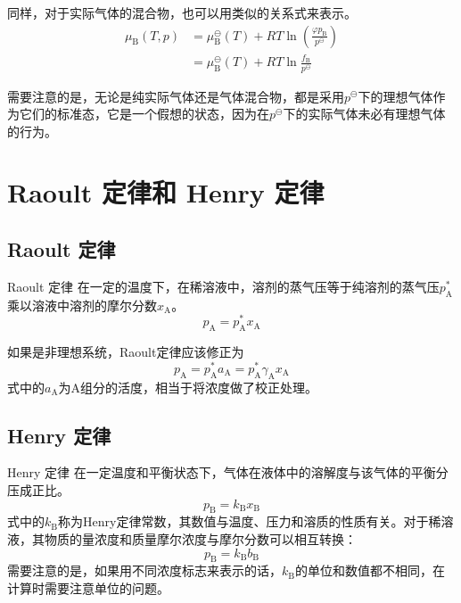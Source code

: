 \documentclass[lang=cn,newtx,11pt,scheme=chinese]{elegantbook}
\begin{document}
同样，对于实际气体的混合物，也可以用类似的关系式来表示。
\begin{equation}
	\begin{aligned}
		\mu_\mathrm{B}(T,p) &=\mu_\mathrm{B}^\ominus(T)+RT\ln \left(\frac{\varphi p_\mathrm{B}}{p^\ominus}\right) \\
		&= \mu_\mathrm{B}^\ominus(T)+RT \ln \frac{f_\mathrm{B}}{p^\ominus}
	\end{aligned}
\end{equation}

需要注意的是，无论是纯实际气体还是气体混合物，都是采用$p^\ominus$下的理想气体作为它们的标准态，它是一个假想的状态，因为在$p^\ominus$下的实际气体未必有理想气体的行为。

\section{Raoult 定律和 Henry 定律}
\subsection{Raoult 定律}
\begin{theorem}{Raoult 定律}
	在一定的温度下，在稀溶液中，溶剂的蒸气压等于纯溶剂的蒸气压$p^*_\mathrm{A}$乘以溶液中溶剂的摩尔分数$x_\mathrm{A}$。
	\begin{equation}
		p_\mathrm{A} = p^*_\mathrm{A}x_\mathrm{A}
	\end{equation}

	如果是非理想系统，Raoult定律应该修正为
	\begin{equation}
		p_\mathrm{A} = p^*_\mathrm{A}a_\mathrm{A} = p^*_\mathrm{A} \gamma_\mathrm{A}x_\mathrm{A}
	\end{equation}
式中的$a_\mathrm{A}$为A组分的活度，相当于将浓度做了校正处理。
\end{theorem}

\subsection{Henry 定律}
\begin{theorem}{Henry 定律}
	在一定温度和平衡状态下，气体在液体中的溶解度与该气体的平衡分压成正比。
	\begin{equation}
		p_\mathrm{B} = k_\mathrm{B}x_\mathrm{B}
	\end{equation}
式中的$k_\mathrm{B}$称为Henry定律常数，其数值与温度、压力和溶质的性质有关。对于稀溶液，其物质的量浓度和质量摩尔浓度与摩尔分数可以相互转换：
	\begin{equation}
	p_\mathrm{B} = k_\mathrm{B}b_\mathrm{B}
	\end{equation}
需要注意的是，如果用不同浓度标志来表示的话，$k_\mathrm{B}$的单位和数值都不相同，在计算时需要注意单位的问题。
\end{theorem}
\end{document}
